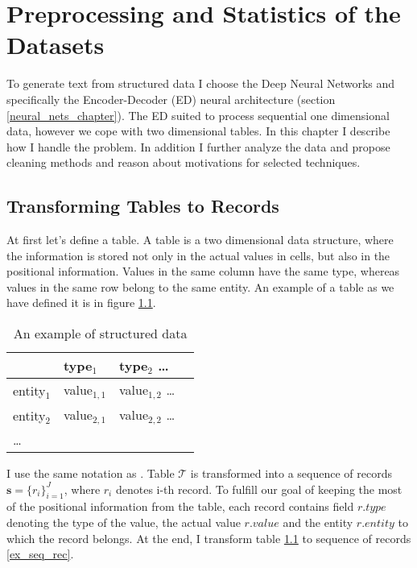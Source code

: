 \chapter{Preprocessing and Statistics of the Datasets} \label{chapPreproc}

To generate text from structured data I choose the Deep Neural Networks and specifically the Encoder-Decoder (ED) neural architecture (section \ref{neural_nets_chapter}). The ED suited to process sequential one dimensional data, however we cope with two dimensional tables. In this chapter I describe how I handle the problem. In addition I further analyze the data and propose cleaning methods and reason about motivations for selected techniques.

\section{Transforming Tables to Records} \label{table_to_record_trans}

At first let's define a table. A table is a two dimensional data structure, where the information is stored not only in the actual values in cells, but also in the positional information. Values in the same column have the same type, whereas values in the same row belong to the same entity. An example of a table as we have defined it is in figure \ref{ex_struct}.

\begin{table}[h]
    \centering
    \begin{tabular}{llll}
        \toprule
        {} & type$_1$ & type$_2$ \dots \\
        \midrule
        entity$_1$ & value$_{1,1}$ &  value$_{1,2}$ \dots \\
        entity$_2$ & value$_{2,1}$ & value$_{2,2}$ \dots \\
        \dots &&
    \end{tabular}
    \caption{An example of structured data} \label{ex_struct}
\end{table}

I use the same notation as \citep{liang-etal-2009-learning}. Table $\mathcal{T}$ is transformed into a sequence of records $ \mathbf{s} = \{ r_i \}_{i=1}^{J} $, where $r_i$ denotes i-th record. To fulfill our goal of keeping the most of the positional information from the table, each record contains field $r.type$ denoting the type of the value, the actual value $r.value$ and the entity $r.entity$ to which the record belongs. At the end, I transform table \ref{ex_struct} to sequence of records \ref{ex_seq_rec}.

